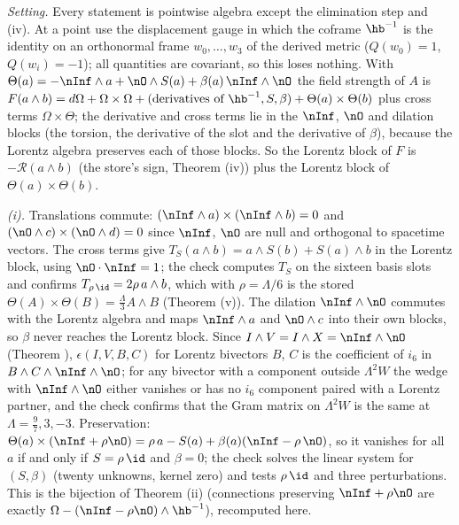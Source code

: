 \emph{Setting.} Every statement is pointwise algebra except the elimination step and (iv). At a point use the displacement gauge in which the coframe $\hb^{-1}$ is the identity on an orthonormal frame $w_{0}, \dots, w_{3}$ of the derived metric ($Q(w_{0}) = 1$, $Q(w_{i}) = -1$); all quantities are covariant, so this loses nothing. With $\Theta(a) = -\nInf \wedge a + \nO \wedge S(a) + \beta(a)\,\nInf \wedge \nO$ the field strength of $A$ is $F(a \wedge b) = d\Omega + \Omega \times \Omega + (\text{derivatives of } \hb^{-1}, S, \beta) + \Theta(a) \times \Theta(b)$ plus cross terms $\Omega \times \Theta$; the derivative and cross terms lie in the $\nInf$, $\nO$ and dilation blocks (the torsion, the derivative of the slot and the derivative of $\beta$), because the Lorentz algebra preserves each of those blocks. So the Lorentz block of $F$ is $-\mathcal{R}(a \wedge b)$ (the store's sign, Theorem (iv)) plus the Lorentz block of $\Theta(a) \times \Theta(b)$.

\emph{(i).} Translations commute: $(\nInf \wedge a) \times (\nInf \wedge b) = 0$ and $(\nO \wedge c) \times (\nO \wedge d) = 0$ since $\nInf$, $\nO$ are null and orthogonal to spacetime vectors. The cross terms give $T_{S}(a \wedge b) = a \wedge S(b) + S(a) \wedge b$ in the Lorentz block, using $\nO \cdot \nInf = 1$; the check computes $T_{S}$ on the sixteen basis slots and confirms $T_{\rho\,\id} = 2\rho\, a \wedge b$, which with $\rho = \Lambda/6$ is the stored $\Theta(A) \times \Theta(B) = \tfrac{\Lambda}{3}A \wedge B$ (Theorem (v)). The dilation $\nInf \wedge \nO$ commutes with the Lorentz algebra and maps $\nInf \wedge a$ and $\nO \wedge c$ into their own blocks, so $\beta$ never reaches the Lorentz block. Since $I \wedge V = I \wedge X = \nInf \wedge \nO$ (Theorem ), $\epsilon(I, V, B, C)$ for Lorentz bivectors $B$, $C$ is the coefficient of $i_{6}$ in $B \wedge C \wedge \nInf \wedge \nO$; for any bivector with a component outside $\Lambda^{2}W$ the wedge with $\nInf \wedge \nO$ either vanishes or has no $i_{6}$ component paired with a Lorentz partner, and the check confirms that the Gram matrix on $\Lambda^{2}W$ is the same at $\Lambda = \tfrac97, 3, -3$. Preservation: $\Theta(a) \times (\nInf + \rho\nO) = \rho\,a - S(a) + \beta(a)(\nInf - \rho\,\nO)$, so it vanishes for all $a$ if and only if $S = \rho\,\id$ and $\beta = 0$; the check solves the linear system for $(S, \beta)$ (twenty unknowns, kernel zero) and tests $\rho\,\id$ and three perturbations. This is the bijection of Theorem (ii) (connections preserving $\nInf + \rho\nO$ are exactly $\Omega - (\nInf - \rho\nO) \wedge \hb^{-1}$), recomputed here.

